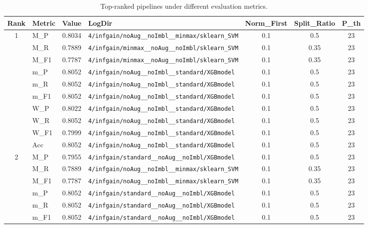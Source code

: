\begin{table}[htbp]
\caption{Top-ranked pipelines under different evaluation metrics.}
\label{tab:rank_metric_vertical}
\centering
\small
\setlength{\tabcolsep}{4pt}
\begin{tabular}{|c|l|c|>{\ttfamily\footnotesize}p{7.2cm}|c|c|c|}
\hline
Rank & Metric & Value & LogDir & Norm\_First & Split\_Ratio & P\_th \\
\hline
\multirow{10}{*}{1} & M\_P & 0.8034 & \texttt{4/infgain/noAug\_\_noImbl\_\_minmax/sklearn\_SVM} & 0.1 & 0.5  & 23 \\ 
 & M\_R & 0.7889 & \texttt{4/infgain/minmax\_\_noAug\_\_noImbl/sklearn\_SVM} & 0.1 & 0.35  & 23 \\ 
 & M\_F1 & 0.7787 & \texttt{4/infgain/minmax\_\_noAug\_\_noImbl/sklearn\_SVM} & 0.1 & 0.35  & 23 \\ 
 & m\_P & 0.8052 & \texttt{4/infgain/noAug\_\_noImbl\_\_standard/XGBmodel} & 0.1 & 0.5  & 23 \\ 
 & m\_R & 0.8052 & \texttt{4/infgain/noAug\_\_noImbl\_\_standard/XGBmodel} & 0.1 & 0.5  & 23 \\ 
 & m\_F1 & 0.8052 & \texttt{4/infgain/noAug\_\_noImbl\_\_standard/XGBmodel} & 0.1 & 0.5  & 23 \\ 
 & W\_P & 0.8022 & \texttt{4/infgain/noAug\_\_noImbl\_\_standard/XGBmodel} & 0.1 & 0.5  & 23 \\ 
 & W\_R & 0.8052 & \texttt{4/infgain/noAug\_\_noImbl\_\_standard/XGBmodel} & 0.1 & 0.5  & 23 \\ 
 & W\_F1 & 0.7999 & \texttt{4/infgain/noAug\_\_noImbl\_\_standard/XGBmodel} & 0.1 & 0.5  & 23 \\ 
 & Acc & 0.8052 & \texttt{4/infgain/noAug\_\_noImbl\_\_standard/XGBmodel} & 0.1 & 0.5  & 23 \\ 
\hline
\multirow{10}{*}{2} & M\_P & 0.7955 & \texttt{4/infgain/standard\_\_noAug\_\_noImbl/XGBmodel} & 0.1 & 0.5  & 23 \\ 
 & M\_R & 0.7889 & \texttt{4/infgain/noAug\_\_noImbl\_\_minmax/sklearn\_SVM} & 0.1 & 0.35  & 23 \\ 
 & M\_F1 & 0.7787 & \texttt{4/infgain/noAug\_\_noImbl\_\_minmax/sklearn\_SVM} & 0.1 & 0.35  & 23 \\ 
 & m\_P & 0.8052 & \texttt{4/infgain/standard\_\_noAug\_\_noImbl/XGBmodel} & 0.1 & 0.5  & 23 \\ 
 & m\_R & 0.8052 & \texttt{4/infgain/standard\_\_noAug\_\_noImbl/XGBmodel} & 0.1 & 0.5  & 23 \\ 
 & m\_F1 & 0.8052 & \texttt{4/infgain/standard\_\_noAug\_\_noImbl/XGBmodel} & 0.1 & 0.5  & 23 \\ 

\end{tabular}
\end{table}
